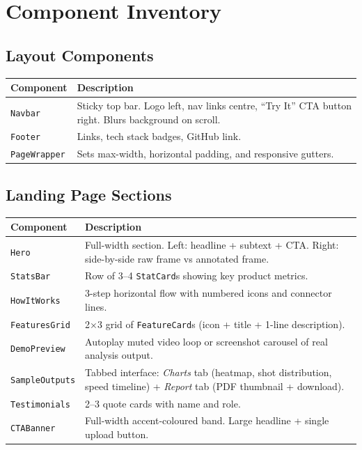 \documentclass[12pt,a4paper]{article}
\begin{document}
\section{Component Inventory}

\subsection{Layout Components}

\begin{tabular}{lp{9cm}}
\toprule
\textbf{Component} & \textbf{Description} \\
\midrule
\texttt{Navbar}      & Sticky top bar. Logo left, nav links centre, ``Try It'' CTA button right. Blurs background on scroll. \\
\texttt{Footer}      & Links, tech stack badges, GitHub link. \\
\texttt{PageWrapper} & Sets max-width, horizontal padding, and responsive gutters. \\
\bottomrule
\end{tabular}

\subsection{Landing Page Sections}

\begin{tabular}{lp{8.8cm}}
\toprule
\textbf{Component} & \textbf{Description} \\
\midrule
\texttt{Hero}          & Full-width section. Left: headline + subtext + CTA. Right: side-by-side raw frame vs annotated frame. \\
\texttt{StatsBar}      & Row of 3--4 \texttt{StatCard}s showing key product metrics. \\
\texttt{HowItWorks}    & 3-step horizontal flow with numbered icons and connector lines. \\
\texttt{FeaturesGrid}  & 2$\times$3 grid of \texttt{FeatureCard}s (icon + title + 1-line description). \\
\texttt{DemoPreview}   & Autoplay muted video loop or screenshot carousel of real analysis output. \\
\texttt{SampleOutputs} & Tabbed interface: \textit{Charts} tab (heatmap, shot distribution, speed timeline) + \textit{Report} tab (PDF thumbnail + download). \\
\texttt{Testimonials}  & 2--3 quote cards with name and role. \\
\texttt{CTABanner}     & Full-width accent-coloured band. Large headline + single upload button. \\
\bottomrule
\end{tabular}
\end{document}
